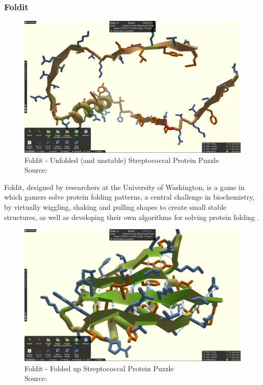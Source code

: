 \subsubsection{Foldit}

\begin{figure}[ht]
    \centering
    \includegraphics[width=\linewidth]{images/background/foldit-problem.png}
    \caption{Foldit - Unfolded (and unstable) Streptococcal Protein Puzzle \\ Source: \cite{foldit-protein-problem}}
    \label{fig:foldit-problem}
\end{figure}

Foldit, designed by researchers at the University of Washington, is a game in which gamers solve protein folding patterns, a central challenge in biochemistry, by virtually wiggling, shaking and pulling shapes to create small stable structures, as well as developing their own algorithms for solving protein folding \cite{bourzac2008enlisting}. 

\begin{figure}[ht]
    \centering
    \includegraphics[width=\linewidth]{images/background/foldit-solution.png}
    \caption{Foldit - Folded up Streptococcal Protein Puzzle \\ Source: \cite{foldit-protein-solution}}
    \label{fig:foldit-solution}
\end{figure}

